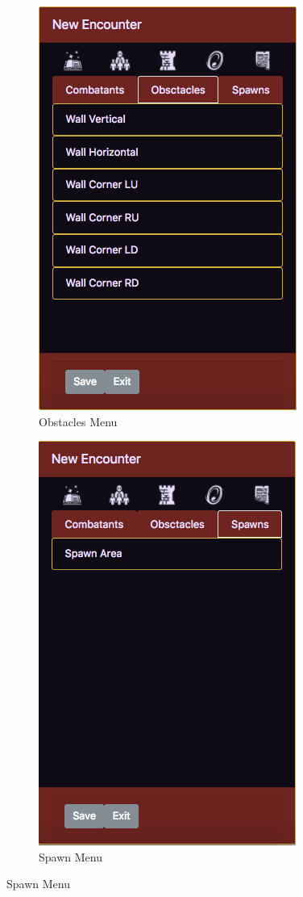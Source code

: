 \documentclass[12pt,a4paper]{report}
\begin{document}
\begin{figure}[H]
\begin{subfigure}{.3\textwidth}
				\includegraphics[scale=.37]{sidebarobstaclesmenu}
				\caption{Obstacles Menu}
				\label{fig: Obstacles Menu}
				\end{subfigure}%
				\begin{subfigure}{.3\textwidth}
				\centering
				\includegraphics[scale=.37]{sidebarspawnsmenu}
				\caption{Spawn Menu}
				\label{fig: Spawn Menu}
				\end{subfigure}
			\end{figure}
			\newpage
\end{document}
